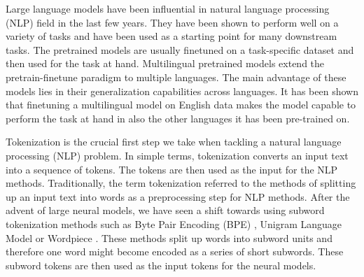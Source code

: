 





Large language models have been influential in natural language processing (NLP) field in the last few years. They have been shown to perform well on a variety of tasks and have been used as a starting point for many downstream tasks. The pretrained models are usually finetuned on a task-specific dataset and then used for the task at hand. \cite{devlin_bert_2019,radford_improving_nodate} Multilingual pretrained models extend the pretrain-finetune paradigm to multiple languages. The main advantage of these models lies in their generalization capabilities across languages. It has been shown that finetuning a multilingual model on English data makes the model capable to perform the task at hand in also the other languages it has been pre-trained on. \cite{k_cross-lingual_2022,conneau_unsupervised_2020-1}

Tokenization is the crucial first step we take when tackling a natural language processing (NLP) problem. In simple terms, tokenization converts an input text into a sequence of tokens. The tokens are then used as the input for the NLP methods. Traditionally, the term tokenization referred to the methods of splitting up an input text into words as a preprocessing step for NLP methods. After the advent of large neural models, we have seen a shift towards using subword tokenization methods such as Byte Pair Encoding (BPE) \cite{sennrich_neural_2016}, Unigram Language Model \cite{kudo_sentencepiece_2018} or Wordpiece \cite{devlin_bert_2019}. These methods split up words into subword units and therefore one word might become encoded as a series of short subwords. These subword tokens are then used as the input tokens for the neural models.

